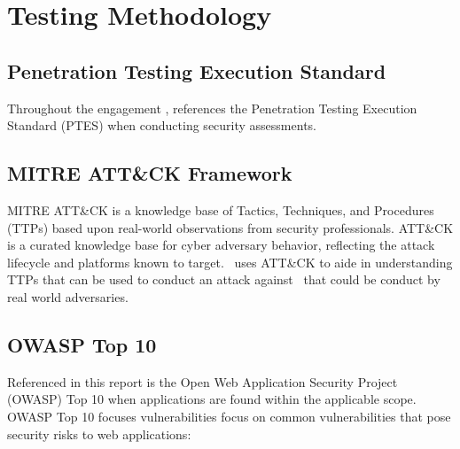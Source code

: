 \section{Testing Methodology}
\subsection{Penetration Testing Execution Standard}
    Throughout the engagement \teamname, references the Penetration Testing Execution Standard (PTES) when conducting security assessments.
    

\subsection{MITRE ATT\&CK Framework}

    MITRE ATT\&CK is a knowledge base of Tactics, Techniques, and Procedures (TTPs) based upon real-world observations from security professionals. ATT\&CK is a curated knowledge base for cyber adversary behavior, reflecting the attack lifecycle and platforms known to target. \teamname\ uses ATT\&CK to aide in understanding TTPs that can be used to conduct an attack against \cptc\ that could be conduct by real world adversaries.

\subsection{OWASP Top 10}

    Referenced in this report is the Open Web Application Security Project (OWASP) Top 10 when applications are found within the applicable scope. OWASP Top 10 focuses vulnerabilities focus on common vulnerabilities that pose security risks to web applications:
    \setlength\arrayrulewidth{1.25pt}

